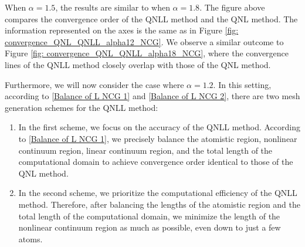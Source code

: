 
When $\alpha = 1.5$, the results are similar to when $\alpha = 1.8$. The figure above compares the convergence order of the QNLL method and the QNL method. The information represented on the axes is the same as in Figure \ref{fig: convergence_QNL_QNLL_alpha12_NCG}. We observe a similar outcome to Figure \ref{fig: convergence_QNL_QNLL_alpha18_NCG}, where the convergence lines of the QNLL method closely overlap with those of the QNL method.


Furthermore, we will now consider the case where $\alpha=1.2$. In this setting, according to \eqref{Balance of L NCG 1} and \eqref{Balance of L NCG 2}, there are two mesh generation schemes for the QNLL method:
\begin{enumerate}
	\item In the first scheme, we focus on the accuracy of the QNLL method. According to \eqref{Balance of L NCG 1}, we precisely balance the atomistic region, nonlinear continuum region, linear continuum region, and the total length of the computational domain to achieve convergence order identical to those of the QNL method.
	
	\item In the second scheme, we prioritize the computational efficiency of the QNLL method. Therefore, after balancing the lengths of the atomistic region and the total length of the computational domain, we minimize the length of the nonlinear continuum region as much as possible, even down to just a few atoms.
\end{enumerate}



